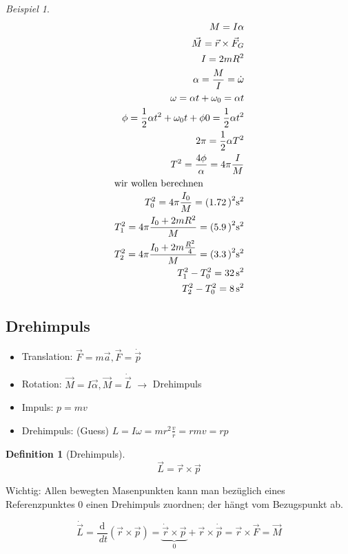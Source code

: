 \documentclass[a4paper]{scrartcl}
\renewcommand{\d}{\mathrm{d}}
\renewcommand{\v}[1]{\vec{#1}}
\newcommand{\dd}[2]{\frac{\d #1}{\ d#2}}
\theoremstyle{definition}
\newtheorem{defn}{Definition}
\theoremstyle{plain}
\theoremstyle{plain}
\theoremstyle{remark}
\theoremstyle{remark}
\theoremstyle{remark}
\newtheorem{ex}{Beispiel}
\begin{document}
\begin{ex}
\begin{align*}
M = I \alpha \\
\v M = \v r \times \v F_G \\
I = 2m R^2 \\
\alpha = \frac{M}{I} = \dot{\omega} \\
\omega = \alpha t + \omega_0 = \alpha t \\
\phi = \frac{1}{2} \alpha t^2 + \omega_0 t + \phi 0 = \frac{1}{2} \alpha t^2 \\
2\pi = \frac{1}{2} \alpha T^2 \\
T^2 = \frac{4 \phi}{\alpha} = 4 \pi \frac{I}{M} \\
\intertext{wir wollen berechnen}
T_0^2 = 4\pi \frac{I_0}{M} = (\SI{1.72})^2 \si{\second\squared} \\
T_1^2 = 4\pi \frac{I_0 + 2 m R^2}{M} = (\SI{5.9})^2 \si{\second\squared} \\
T_2^2 = 4\pi \frac{I_0 + 2 m \frac{R^2}{4}}{M} = (\SI{3.3})^2 \si{\second\squared} \\
T_1^2 - T_0^2 = \SI{32}{\second\squared} \\
T_2^2 - T_0^2 = \SI{8}{\second\squared} \\
\end{align*}
\end{ex}
\subsection{Drehimpuls}
\label{sec-8-5}
\begin{itemize}
\item Translation: $\v F = m \v a, \v F = \dot{\v p}$
\item Rotation: $\v M = I \v \alpha, \v M = \dot{\v L}$ $\rightarrow$ Drehimpuls
\item Impuls: $p = mv$
\item Drehimpuls: (Guess) $L = I \omega = m r^2 \frac{v}{r} = r m v = r p$
\end{itemize}

\begin{defn}[Drehimpuls]
\[\v L = \v r \times \v p\]
\end{defn}
Wichtig: Allen bewegten Masenpunkten kann man bezüglich eines Referenzpunktes $0$ einen Drehimpuls zuordnen; der hängt vom Bezugspunkt ab.

\[\dot{\v L} = \dd{}{t} (\v r \times \v p) = \underbrace{\dot{\v r} \times \v p}_{0} + \v r \times \dot{\v p} = \v r \times \v F = \v M\]
\end{document}

